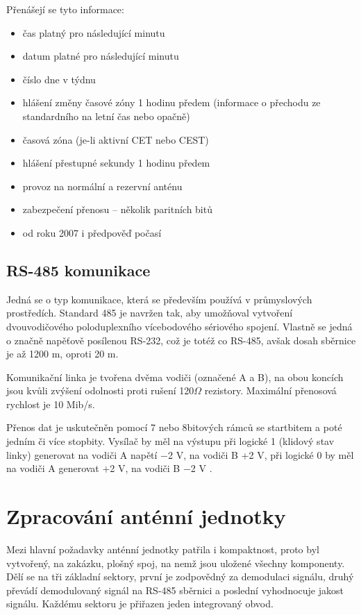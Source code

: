     Přenášejí se tyto informace:

    \begin{itemize}
        \item čas platný pro následující minutu
        \item datum platné pro následující minutu
        \item číslo dne v týdnu
        \item hlášení změny časové zóny 1 hodinu předem (informace o přechodu ze standardního na letní čas nebo opačně)
        \item časová zóna (je-li aktivní CET nebo CEST)
        \item hlášení přestupné sekundy 1 hodinu předem
        \item provoz na normální a rezervní anténu
        \item zabezpečení přenosu – několik paritních bitů
        \item od roku 2007 i předpověď počasí
    \end{itemize}

\subsection{RS-485 komunikace}
    Jedná se o typ komunikace, která se především používá v průmyslových prostředích.
    Standard 485 je navržen tak, aby umožňoval vytvoření dvouvodičového poloduplexního
    vícebodového sériového spojení. Vlastně se jedná o značně napěťově posílenou RS-232, což je
    totéž co RS-485, avšak dosah sběrnice je až 1200 m, oproti 20 m.

    Komunikační linka je tvořena dvěma vodiči (označené A a B), na obou koncích jsou kvůli
    zvýšení odolnosti proti rušení 120$\Omega$ rezistory. Maximální přenosová rychlost je
    10 Mib/s.

    Přenos dat je uskutečněn pomocí 7 nebo 8bitových rámců se startbitem a poté jedním či
    více stopbity. Vysílač by měl na výstupu při logické 1 (klidový stav linky) generovat
    na vodiči A napětí −2 V, na vodiči B +2 V, při logické 0 by měl na vodiči A generovat
    +2 V, na vodiči B −2 V \cite{rs485}.

\section{Zpracování anténní jednotky}
Mezi hlavní požadavky anténní jednotky patřila i kompaktnost, proto byl vytvořený, na zakázku,
plošný spoj, na nemž jsou uložené všechny komponenty. Dělí se na tři základní sektory,
první je zodpovědný za demodulaci signálu, druhý převádí demodulovaný signál na RS-485
sběrnici a poslední vyhodnocuje jakost signálu. Každému sektoru je přiřazen jeden
integrovaný obvod.
